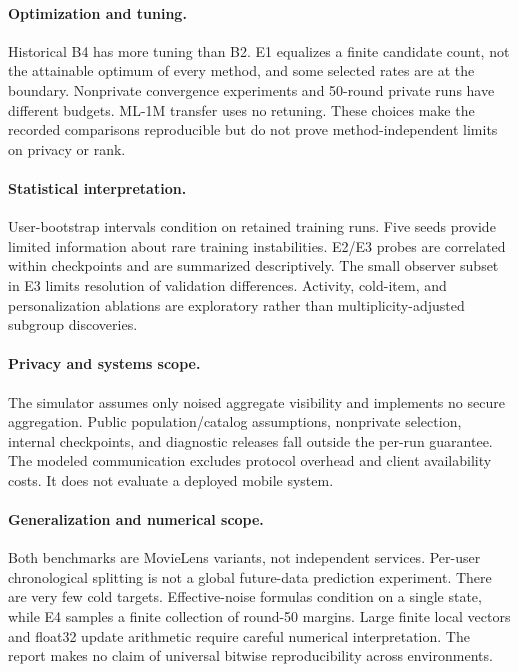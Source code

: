 \paragraph{Optimization and tuning.}
Historical B4 has more tuning than B2. E1 equalizes a finite candidate count,
not the attainable optimum of every method, and some selected rates are at
the boundary. Nonprivate convergence experiments and 50-round private runs
have different budgets. ML-1M transfer uses no retuning. These choices make
the recorded comparisons reproducible but do not prove method-independent
limits on privacy or rank.

\paragraph{Statistical interpretation.}
User-bootstrap intervals condition on retained training runs. Five seeds
provide limited information about rare training instabilities. E2/E3 probes
are correlated within checkpoints and are summarized descriptively. The
small observer subset in E3 limits resolution of validation differences.
Activity, cold-item, and personalization ablations are exploratory rather
than multiplicity-adjusted subgroup discoveries.

\paragraph{Privacy and systems scope.}
The simulator assumes only noised aggregate visibility and implements no
secure aggregation. Public population/catalog assumptions, nonprivate
selection, internal checkpoints, and diagnostic releases fall outside the
per-run guarantee. The modeled communication excludes protocol overhead
and client availability costs. It does not evaluate a deployed mobile system.

\paragraph{Generalization and numerical scope.}
Both benchmarks are MovieLens variants, not independent services. Per-user
chronological splitting is not a global future-data prediction experiment.
There are very few cold targets. Effective-noise formulas condition on a
single state, while E4 samples a finite collection of round-50 margins.
Large finite local vectors and float32 update arithmetic require careful
numerical interpretation. The report makes no claim of universal bitwise
reproducibility across environments.


